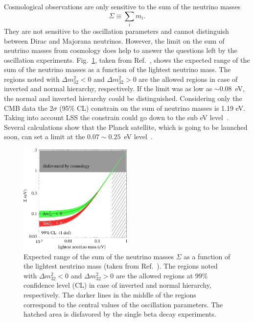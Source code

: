 Cosmological observations are only sensitive to the sum of the neutrino masses
\begin{equation}
  \label{eq:msum}
  \Sigma \equiv \sum_{i}m_{i}.
\end{equation}
They are not sensitive to the oscillation parameters and cannot distinguish between Dirac and Majorana neutrinos. However, the limit on the sum of neutrino masses from cosmology does help to answer the questions left by the oscillation experiments. Fig.~\ref{fig:sumVSlightest}, taken from Ref.~\cite{Str05}, shows the expected range of the sum of the neutrino masses as a function of the lightest neutrino mass. The regions noted with $\Delta m^{2}_{32}<0$ and $\Delta m^{2}_{32}>0$ are the allowed regions in case of inverted and normal hierarchy, respectively. If the limit was as low as $\sim 0.08$~eV, the normal and inverted hierarchy could be distinguished. Considering only the CMB data the $2\sigma$ (95\% CL) constrain on the sum of neutrino masses is 1.19 eV. Taking into account LSS the constrain could go down to the sub eV level~\cite{Fog08}. Several calculations show that the Planck satellite, which is going to be launched soon, can set a limit at the $0.07 \sim 0.25$~eV level~\cite{Pla05}.
\begin{figure}[tbhp]
  \centering
  \includegraphics[width=0.5\textwidth]{sumVSlightest.eps}  
  \caption{Expected range of the sum of the neutrino masses $\Sigma$     as a function of the lightest neutrino mass (taken from     Ref.~\cite{Str05}). The regions noted with $\Delta m^{2}_{32}<0$     and $\Delta m^{2}_{32}>0$ are the allowed regions at 99\%     confidence level (CL) in case of inverted and normal hierarchy,     respectively. The darker lines in the middle of the regions     correspond to the central values of the oscillation     parameters. The hatched area is disfavored by the single beta     decay experiments.}
  \label{fig:sumVSlightest}
\end{figure}

